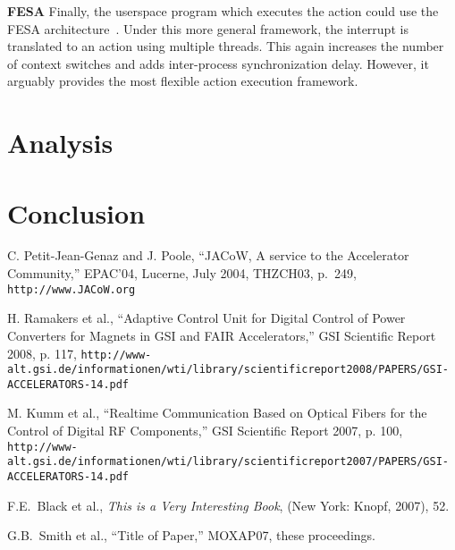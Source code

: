\documentclass{JAC2003}
\begin{document}
\textbf{FESA}
Finally, the userspace program which executes the action could use the FESA
architecture~\cite{fesa}.
Under this more general framework,
the interrupt is translated to an action using multiple threads.
This again increases the number of context switches and adds inter-process
synchronization delay.
However, it arguably provides the most flexible action execution framework.

\section{Analysis}


\section{Conclusion}




\begin{thebibliography}{9}   %

C. Petit-Jean-Genaz and J. Poole, ``JACoW, A service to the Accelerator Community,''
EPAC'04, Lucerne, July 2004, THZCH03,  p.~249, \texttt{http://www.JACoW.org}

H. Ramakers  et al., ``Adaptive Control Unit for Digital Control of Power Converters for Magnets in GSI and FAIR Accelerators,'' GSI Scientific Report 2008, p. 117,
\texttt{http://www-alt.gsi.de/informationen/wti/library/scientificreport2008/PAPERS/GSI-ACCELERATORS-14.pdf}

M. Kumm  et al., ``Realtime Communication Based on Optical Fibers for the Control of Digital RF Components,'' GSI Scientific Report 2007, p. 100,
\texttt{http://www-alt.gsi.de/informationen/wti/library/scientificreport2007/PAPERS/GSI-ACCELERATORS-14.pdf}



F.E.~Black et al., {\it This is a Very Interesting Book}, (New York: Knopf, 2007), 52.

G.B.~Smith et al., ``Title of Paper,'' MOXAP07, these proceedings.
\end{thebibliography}
\end{document}
